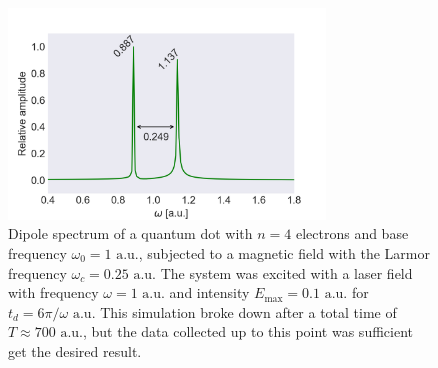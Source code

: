 \begin{figure}
    \centering    
    \includegraphics[width=0.75\textwidth]
        {results/figures/B_field/n=4/b_spectrum_n=4_omc=025.png}
    \caption{Dipole spectrum of a quantum dot with $n=4$ electrons and base frequency 
        $\omega_0 = 1 \text{ a.u.}$,
        subjected to a magnetic field with the Larmor frequency
        $\omega_c=0.25 \text{ a.u.}$ The 
        system was excited with a laser field with frequency $\omega = 1 \text{ a.u.}$ 
        and intensity $E_\text{max} = 0.1 \text{ a.u.}$ for $t_d = 6\pi/\omega \text{ a.u.}$
        This simulation broke down after a total time of $T\approx700 \text{ a.u.}$,
        but the data collected up to this point was sufficient get the desired result.
        }
    \label{fig:b_n4_omc025}
\end{figure}

\clearemptydoublepage
